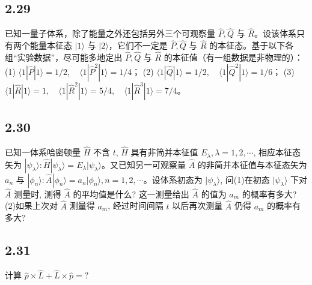 \subsection{2.29}
已知一量子体系，除了能量之外还包括另外三个可观察量 $\hat{P}, \hat{Q}$ 与 $\hat{R}$。设该体系只有两个能量本征态 $|1\rangle$ 与 $|2\rangle$，它们不一定是 $\hat{P}, \hat{Q}$ 与 $\hat{R}$ 的本征态。基于以下各组“实验数据”，尽可能多地定出 $\hat{P}, \hat{Q}$ 与 $\hat{R}$ 的本征值（有一组数据是非物理的）：
(1) $\langle 1|\hat{P}|1\rangle = 1/2, \quad \langle 1|\hat{P}^2|1\rangle = 1/4$；
(2) $\langle 1|\hat{Q}|1\rangle = 1/2, \quad \langle 1|\hat{Q}^2|1\rangle = 1/6$；
(3) $\langle 1|\hat{R}|1\rangle = 1, \quad \langle 1|\hat{R}^2|1\rangle = 5/4, \quad \langle 1|\hat{R}^3|1\rangle = 7/4$。

\subsection{2.30}
已知一体系哈密顿量 $\hat{H}$ 不含 $t$, $\hat{H}$ 具有非简并本征值 $E_{\lambda}, \lambda = 1, 2, \cdots$, 相应本征态矢为 $|\psi_{\lambda}\rangle: \hat{H}|\psi_{\lambda}\rangle = E_{\lambda}|\psi_{\lambda}\rangle$。又已知另一可观察量 $\hat{A}$ 的非简并本征值与本征态矢为 $a_n$ 与 $|\phi_n\rangle: \hat{A}|\phi_n\rangle = a_n|\phi_n\rangle, n = 1, 2, \cdots$。设体系初态为 $|\psi_{\lambda}\rangle$, 问(1)在初态 $|\psi_{\lambda}\rangle$ 下对 $\hat{A}$ 测量时, 测得 $\hat{A}$ 的平均值是什么? 这一测量给出 $\hat{A}$ 的值为 $a_m$ 的概率有多大? (2)如果上次对 $\hat{A}$ 测量得 $a_m$, 经过时间间隔 $t$ 以后再次测量 $\hat{A}$ 仍得 $a_m$ 的概率有多大?



\newpage
\subsection{2.31}
计算 $\hat{p} \times \hat{L} + \hat{L} \times \hat{p} = ?$

